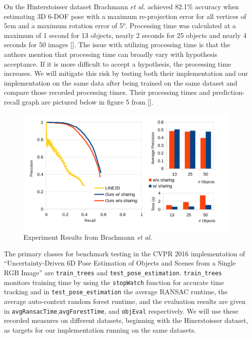 \documentclass[12pt]{article}
\begin{document}
On the Hinterstoisser dataset Brachmann \emph{et al.} achieved 82.1\%
accuracy when estimating 3D 6-DOF pose with a maximum re-projection
error for all vertices of 5cm and a maximum rotation error of 5°.
Processing time was calculated at a maximum of 1 second for 13 objects,
nearly 2 seconds for 25 objects and nearly 4 seconds for 50 images
{[}{]}. The issue with utilizing processing time is that the authors
mention that processing time can broadly vary with hypothesis
acceptance. If it is more difficult to accept a hypothesis, the
processing time increases. We will mitigate this risk by testing both
their implementation and our implementation on the same data after being
trained on the same dataset and compare those recorded processing times.
Their processing times and prediction-recall graph are pictured below in
figure 5 from {[}{]}.

\begin{figure}
\centering
\includegraphics{Pictures/figure5.png}
\caption{Experiment Results from Brachmann \emph{et al.}}
\end{figure}

The primary classes for benchmark testing in the CVPR 2016
implementation of ``Uncertainty-Driven 6D Pose Estimation of Objects and
Scenes from a Single RGB Image'' are \texttt{train\_trees} and
\texttt{test\_pose\_estimation}. \texttt{train\_trees} monitors training
time by using the \texttt{stopWatch} function for accurate time tracking
and in \texttt{test\_pose\_estimation} the average RANSAC runtime, the
average auto-context random forest runtime, and the evaluation results
are given in \texttt{avgRansacTime},\texttt{avgForestTime}, and
\texttt{objEval} respectively. We will use these recorded measures on
different datasets, beginning with the Hinerstoisser dataset, as targets
for our implementation running on the same datasets.
\end{document}
